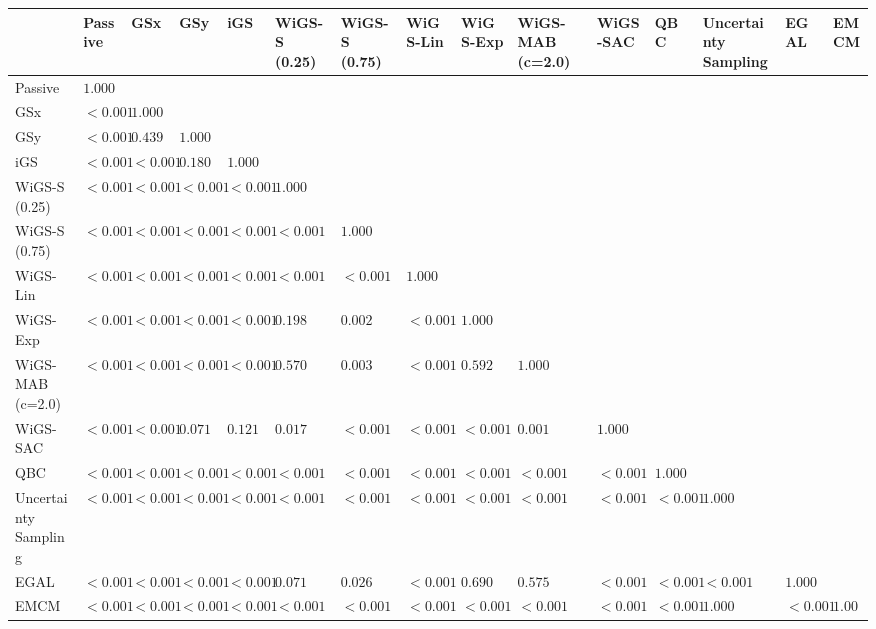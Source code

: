 \begin{tabular}{lllllllllllllll}
\toprule
 & Passive & GSx & GSy & iGS & WiGS-S (0.25) & WiGS-S (0.75) & WiGS-Lin & WiGS-Exp & WiGS-MAB (c=2.0) & WiGS-SAC & QBC & Uncertainty Sampling & EGAL & EMCM \\
\midrule
Passive & $1.000$ &  &  &  &  &  &  &  &  &  &  &  &  &  \\
GSx & $<0.001$ & $1.000$ &  &  &  &  &  &  &  &  &  &  &  &  \\
GSy & $<0.001$ & $0.439$ & $1.000$ &  &  &  &  &  &  &  &  &  &  &  \\
iGS & $<0.001$ & $<0.001$ & $0.180$ & $1.000$ &  &  &  &  &  &  &  &  &  &  \\
WiGS-S (0.25) & $<0.001$ & $<0.001$ & $<0.001$ & $<0.001$ & $1.000$ &  &  &  &  &  &  &  &  &  \\
WiGS-S (0.75) & $<0.001$ & $<0.001$ & $<0.001$ & $<0.001$ & $<0.001$ & $1.000$ &  &  &  &  &  &  &  &  \\
WiGS-Lin & $<0.001$ & $<0.001$ & $<0.001$ & $<0.001$ & $<0.001$ & $<0.001$ & $1.000$ &  &  &  &  &  &  &  \\
WiGS-Exp & $<0.001$ & $<0.001$ & $<0.001$ & $<0.001$ & $0.198$ & $0.002$ & $<0.001$ & $1.000$ &  &  &  &  &  &  \\
WiGS-MAB (c=2.0) & $<0.001$ & $<0.001$ & $<0.001$ & $<0.001$ & $0.570$ & $0.003$ & $<0.001$ & $0.592$ & $1.000$ &  &  &  &  &  \\
WiGS-SAC & $<0.001$ & $<0.001$ & $0.071$ & $0.121$ & $0.017$ & $<0.001$ & $<0.001$ & $<0.001$ & $0.001$ & $1.000$ &  &  &  &  \\
QBC & $<0.001$ & $<0.001$ & $<0.001$ & $<0.001$ & $<0.001$ & $<0.001$ & $<0.001$ & $<0.001$ & $<0.001$ & $<0.001$ & $1.000$ &  &  &  \\
Uncertainty Sampling & $<0.001$ & $<0.001$ & $<0.001$ & $<0.001$ & $<0.001$ & $<0.001$ & $<0.001$ & $<0.001$ & $<0.001$ & $<0.001$ & $<0.001$ & $1.000$ &  &  \\
EGAL & $<0.001$ & $<0.001$ & $<0.001$ & $<0.001$ & $0.071$ & $0.026$ & $<0.001$ & $0.690$ & $0.575$ & $<0.001$ & $<0.001$ & $<0.001$ & $1.000$ &  \\
EMCM & $<0.001$ & $<0.001$ & $<0.001$ & $<0.001$ & $<0.001$ & $<0.001$ & $<0.001$ & $<0.001$ & $<0.001$ & $<0.001$ & $<0.001$ & $1.000$ & $<0.001$ & $1.000$ \\
\bottomrule
\end{tabular}
